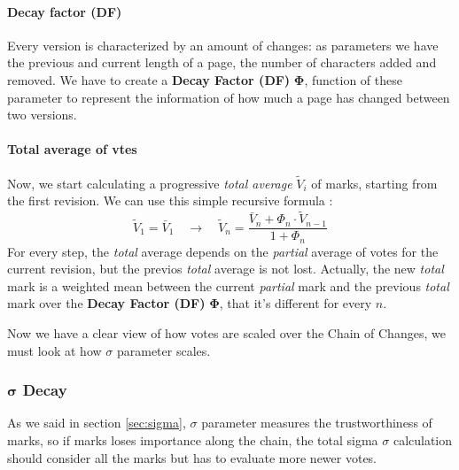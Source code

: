 \documentclass[a4paper,11pt]{article}
\newcommand{\sg}{$\sigma$ }
\newcommand{\ph}[1]{$\tilde{V}_#1$ }
\begin{document}
\paragraph{Decay factor (DF)}
Every version is characterized by an amount of changes: as parameters we have the previous and current length of a page, the number of characters added and removed.
We have to create a \textbf{Decay Factor (DF)} $\mathbf{\Phi}$, function of these parameter to represent the information of how much a page has changed between two versions. 

\paragraph{Total average of vtes} Now, we start calculating a progressive \emph{total average} \ph{i} of marks, starting from the first revision. We can use this simple recursive formula :
\begin{equation} \label{eq:V_hat1}
\tilde{V}_1 = \bar{V}_1  \quad\longrightarrow\quad \tilde{V}_n = \frac{\bar{V}_n + \Phi_n 
\cdot \tilde{V}_{n-1}}{1+ \Phi_n} 
\end{equation}
For every step, the \emph{total} average depends on the \emph{partial} average of votes for the current revision, but the previos \emph{total} average is not lost. 
Actually, the new \emph{total} mark is a weighted mean between the current \emph{partial} mark and the previous \emph{total} mark over the \textbf{Decay Factor (DF)} $\mathbf{\Phi}$, that it's different for every $n$.


Now we have a clear view of how votes are scaled over the Chain of Changes, we must look at how \sg parameter scales.

\subsubsection{$\boldsymbol{\sigma}$ Decay} \label{sec:s_decay}

As we said in section \ref{sec:sigma}, \sg parameter measures the trustworthiness of marks, so if marks loses importance along the chain, the total sigma \sg calculation should consider all the marks but has to evaluate more newer votes. 
\end{document}
